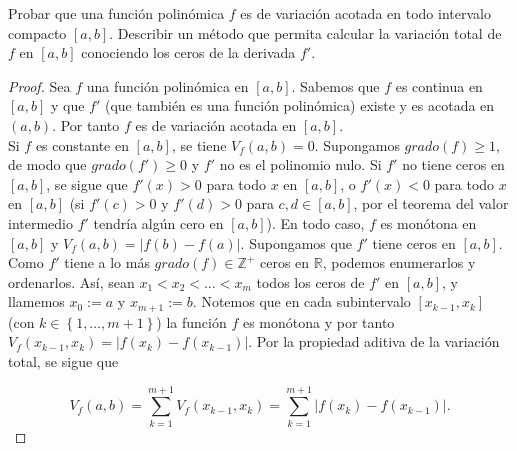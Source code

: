 \setcounter{section}{6}
\setcounter{exercise}{2}
\begin{exercise}

  Probar que una función polinómica $f$ es de variación acotada en todo intervalo compacto $\left[a,b\right]$. Describir un método que permita calcular la variación total de $f$ en $\left[a,b\right]$ conociendo los ceros de la derivada $f'$.

\end{exercise}

\begin{proof}

Sea $f$ una función polinómica en $\left[a,b\right]$. Sabemos que $f$ es continua en $\left[a,b\right]$ y que $f'$ (que también es una función polinómica) existe y es acotada en $\left(a,b\right)$. Por tanto $f$ es de variación acotada en $\left[a,b\right]$.\\
Si $f$ es constante en $\left[a,b\right]$, se tiene $V_f\left(a,b\right)=0$. Supongamos $grado\left(f\right)\geq 1$, de modo que $grado\left(f'\right)\geq 0$ y $f'$ no es el polinomio nulo. Si $f'$ no tiene ceros en $\left[a,b\right]$, se sigue que $f'\left(x\right)>0$ para todo $x$ en $\left[a,b\right]$, o $f'\left(x\right)<0$ para todo $x$ en $\left[a,b\right]$ (si $f'\left(c\right)>0$ y $f'\left(d\right)>0$ para $c,d\in \left[a,b\right]$, por el teorema del valor intermedio $f'$ tendría algún cero en $\left[a,b\right]$). En todo caso, $f$ es monótona en $\left[a,b\right]$ y $V_f\left(a,b\right)=|f\left(b\right)-f\left(a\right)|$. Supongamos que $f'$ tiene ceros en $\left[a,b\right]$. Como $f'$ tiene a lo más $grado\left(f\right)\in \mathds{Z}^{+}$ ceros en $\mathds{R}$, podemos enumerarlos y ordenarlos. Así, sean $x_1<x_2<\dots<x_m$ todos los ceros de $f'$ en $\left[a,b\right]$, y llamemos $x_0:=a$ y $x_{m+1}:=b$. Notemos que en cada subintervalo $\left[x_{k-1},x_k\right]$ (con $k\in \left\lbrace 1,\dots, m+1 \right\rbrace$) la función $f$ es monótona y por tanto $V_f\left(x_{k-1},x_k\right)=|f\left(x_k\right)-f\left(x_{k-1}\right)|$. Por la propiedad aditiva de la variación total, se sigue que

\begin{equation*}
  V_f\left(a,b\right)=\sum_{k=1}^{m+1}V_f\left(x_{k-1},x_k\right)=\sum_{k=1}^{m+1}|f\left(x_k\right)-f\left(x_{k-1}\right)|.
\end{equation*}

\end{proof}
